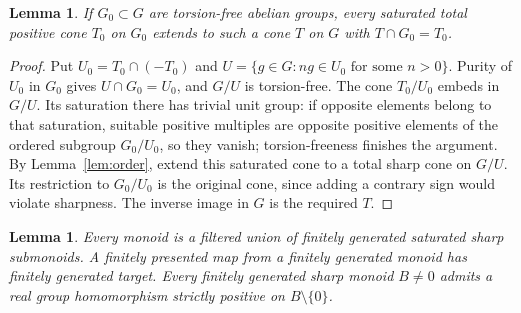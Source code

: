 \documentclass[11pt]{article}
\newtheorem{lemma}[theorem]{Lemma}
\theoremstyle{definition}
\theoremstyle{remark}
\begin{document}
\begin{lemma}\label{lem:preorder-extension}
If $G_0\subset G$ are torsion-free abelian groups, every saturated total positive cone $T_0$ on $G_0$ extends to such a cone $T$ on $G$ with $T\cap G_0=T_0$.
\end{lemma}

\begin{proof}
Put $U_0=T_0\cap(-T_0)$ and $U=\{g\in G:ng\in U_0\text{ for some }n>0\}$. Purity of $U_0$ in $G_0$ gives $U\cap G_0=U_0$, and $G/U$ is torsion-free. The cone $T_0/U_0$ embeds in $G/U$. Its saturation there has trivial unit group: if opposite elements belong to that saturation, suitable positive multiples are opposite positive elements of the ordered subgroup $G_0/U_0$, so they vanish; torsion-freeness finishes the argument. By Lemma~\ref{lem:order}, extend this saturated cone to a total sharp cone on $G/U$. Its restriction to $G_0/U_0$ is the original cone, since adding a contrary sign would violate sharpness. The inverse image in $G$ is the required $T$.
\end{proof}

\begin{lemma}\label{lem:finite}
Every monoid is a filtered union of finitely generated saturated sharp submonoids. A finitely presented map from a finitely generated monoid has finitely generated target. Every finitely generated sharp monoid $B\neq0$ admits a real group homomorphism strictly positive on $B\setminus\{0\}$.
\end{lemma}
\end{document}
